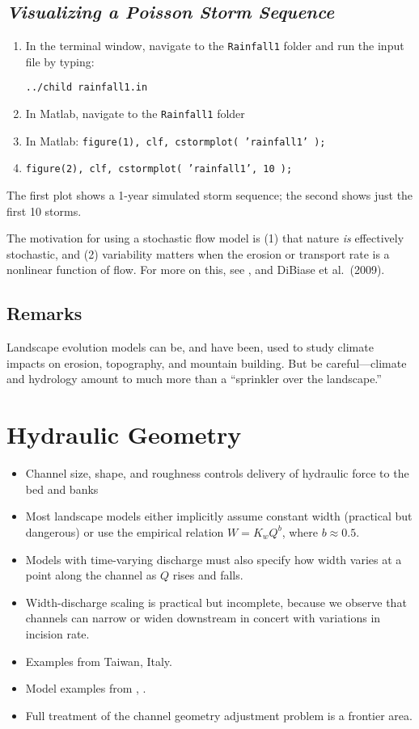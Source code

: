 \documentclass[12pt]{amsart}
\begin{document}
\subsection*{\em Visualizing a Poisson Storm Sequence}

{\em
\begin{enumerate}
\item
In the terminal window, navigate to the {\tt Rainfall1} folder and run the input file by typing:

{\tt ../child rainfall1.in}
\item
In Matlab, navigate to the {\tt Rainfall1} folder
\item
In Matlab: {\tt figure(1), clf, cstormplot( 'rainfall1' );}
\item
{\tt figure(2), clf, cstormplot( 'rainfall1', 10 );}
\end{enumerate}
The first plot shows a 1-year simulated storm sequence; the second shows just the first 10 storms.}

The motivation for using a stochastic flow model is (1) that nature {\em is} effectively stochastic, and (2) variability matters when the erosion or transport rate is a nonlinear function of flow. For more on this, see \citet{tucker2000stochastic,snyder2003importance,tucker2004drainage}, and DiBiase et al.\ (2009).

\subsection{Remarks}

Landscape evolution models can be, and have been, used to study climate impacts on erosion, topography, and mountain building. But be careful---climate and hydrology amount to much more than a ``sprinkler over the landscape.''

\section{Hydraulic Geometry}

\begin{itemize}
\item Channel size, shape, and roughness controls delivery of hydraulic force to the bed and banks
\item Most landscape models either implicitly assume constant width (practical but dangerous) or use the empirical relation $W = K_w Q^b$, where $b\approx 0.5$.
\item Models with time-varying discharge must also specify how width varies at a point along the channel as $Q$ rises and falls.
\item Width-discharge scaling is practical but incomplete, because we observe that channels can narrow or widen downstream in concert with variations in incision rate.
\item Examples from Taiwan, Italy.
\item Model examples from \citet{wobus2006self}, \citet{attal2008modeling}.
\item Full treatment of the channel geometry adjustment problem is a frontier area.
\end{itemize}
\end{document}
